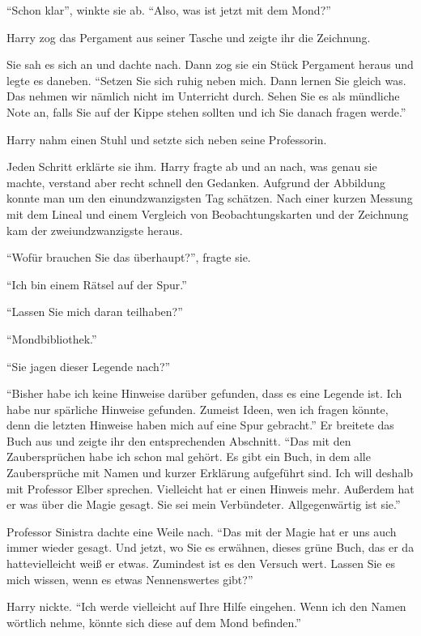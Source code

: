 \enquote{Schon klar}, winkte sie ab. \enquote{Also, was ist jetzt mit dem Mond?}

Harry zog das Pergament aus seiner Tasche und zeigte ihr die Zeichnung.

Sie sah es sich an und dachte nach. Dann zog sie ein Stück Pergament heraus und legte es daneben. \enquote{Setzen Sie sich ruhig neben mich. Dann lernen Sie gleich was. Das nehmen wir nämlich nicht im Unterricht durch. \gst Sehen Sie es als mündliche Note an, falls Sie auf der Kippe stehen sollten und ich Sie danach fragen werde.}

Harry nahm einen Stuhl und setzte sich neben seine Professorin.

Jeden Schritt erklärte sie ihm. Harry fragte ab und an nach, was genau sie machte, verstand aber recht schnell den Gedanken. Aufgrund der Abbildung konnte man um den einundzwanzigsten Tag schätzen. Nach einer kurzen Messung mit dem Lineal und einem Vergleich von Beobachtungskarten und der Zeichnung kam der zweiundzwanzigste heraus.

\enquote{Wofür brauchen Sie das überhaupt?}, fragte sie.

\enquote{Ich bin einem Rätsel auf der Spur.}

\enquote{Lassen Sie mich daran teilhaben?}

\enquote{Mondbibliothek.}

\enquote{Sie jagen dieser Legende nach?}

\enquote{Bisher habe ich keine Hinweise darüber gefunden, dass es eine Legende ist. Ich habe nur spärliche Hinweise gefunden. Zumeist Ideen, wen ich fragen könnte, denn die letzten Hinweise haben mich auf eine Spur gebracht.} Er breitete das Buch aus und zeigte ihr den entsprechenden Abschnitt. \enquote{Das mit den Zaubersprüchen habe ich schon mal gehört. Es gibt ein Buch, in dem alle Zaubersprüche mit Namen und kurzer Erklärung aufgeführt sind. Ich will deshalb mit Professor Elber sprechen. Vielleicht hat er einen Hinweis mehr. Außerdem hat er was über die Magie gesagt. Sie sei mein Verbündeter. Allgegenwärtig ist sie.}

Professor Sinistra dachte eine Weile nach. \enquote{Das mit der Magie hat er uns auch immer wieder gesagt. Und jetzt, wo Sie es erwähnen, dieses grüne Buch, das er da hatte\abs vielleicht weiß er etwas. Zumindest ist es den Versuch wert. Lassen Sie es mich wissen, wenn es etwas Nennenswertes gibt?}

Harry nickte. \enquote{Ich werde vielleicht auf Ihre Hilfe eingehen. Wenn ich den Namen wörtlich nehme, könnte sich diese auf dem Mond befinden.}

